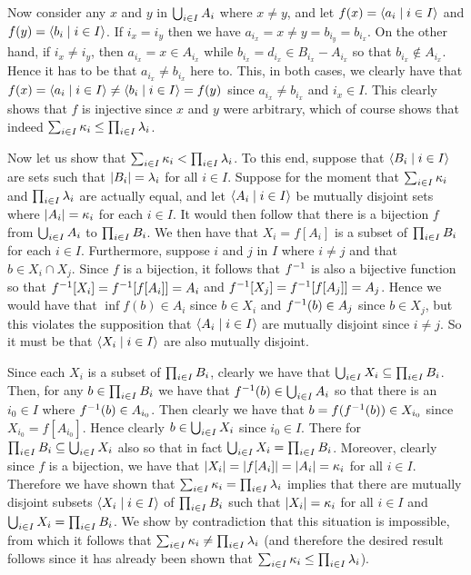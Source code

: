 \begin{questions}
{{    Now consider any $x$ and $y$ in $\bigcup_{i \in I} A_i$ where $x \neq y$, and let $f(x) = \left\langle a_i \mid i \in I \right\rangle$ and $f(y) = \left\langle b_i \mid i \in I \right\rangle$.
    If $i_x = i_y$ then we have $a_{i_x} = x \neq y = b_{i_y} = b_{i_x}$.
    On the other hand, if $i_x \neq i_y$, then $a_{i_x} = x \in A_{i_x}$ while $b_{i_x} = d_{i_x} \in B_{i_x} - A_{i_x}$ so that $b_{i_x} \notin A_{i_x}$.
    Hence it has to be that $a_{i_x} \neq b_{i_x}$ here to.
    This, in both cases, we clearly have that $f(x) = \left\langle a_i \mid i \in I \right\rangle \neq \left\langle b_i \mid i \in I \right\rangle = f(y)$ since $a_{i_x} \neq b_{i_x}$ and $i_x \in I$.
    This clearly shows that $f$ is injective since $x$ and $y$ were arbitrary, which of course shows that indeed $\sum_{i \in I} \kappa_i \leq \prod_{i \in I} \lambda_i$.

    Now let us show that $\sum_{i \in I} \kappa_i < \prod_{i \in I} \lambda_i$.
    To this end, suppose that $\left\langle B_i \mid i \in I \right\rangle$ are sets such that $\left| B_i \right| = \lambda_i$ for all $i \in I$.
    Suppose for the moment that $\sum_{i \in I} \kappa_i$ and $\prod_{i \in I} \lambda_i$ are actually equal, and let $\left\langle A_i \mid i \in I \right\rangle$ be mutually disjoint sets where $\left| A_i \right| = \kappa_i$ for each $i \in I$.
    It would then follow that there is a bijection $f$ from $\bigcup_{i \in I} A_i$ to $\prod_{i \in I} B_i$.
    We then have that $X_i = f[A_i]$ is a subset of $\prod_{i \in I} B_i$ for each $i \in I$.
    Furthermore, suppose $i$ and $j$ in $I$ where $i \neq j$ and that $b \in X_i \cap X_j$.
    Since $f$ is a bijection, it follows that $f^{-1}$ is also a bijective function so that $f^{-1}[X_i] = f^{-1}[f[A_i]] = A_i$ and $f^{-1}[X_j] = f^{-1}[f[A_j]] = A_j$.
    Hence we would have that $\inf{f}(b) \in A_i$ since $b \in X_i$ and $f^{-1}(b) \in A_j$ since $b \in X_j$, but this violates the supposition that $\left\langle A_i \mid i \in I \right\rangle$ are mutually disjoint since $i \neq j$.
    So it must be that $\left\langle X_i \mid i \in I \right\rangle$ are also mutually disjoint.

    Since each $X_i$ is a subset of $\prod_{i \in I} B_i$, clearly we have that $\bigcup_{i \in I} X_i \subseteq \prod_{i \in I} B_i$.
    Then, for any $b \in \prod_{i \in I} B_i$ we have that $f^{-1}(b) \in \bigcup_{i \in I} A_i$ so that there is an $i_0 \in I$ where $f^{-1}(b) \in A_{i_0}$.
    Then clearly we have that $b = f(f^{-1}(b)) \in X_{i_0}$ since $X_{i_0} = f[A_{i_0}]$.
    Hence clearly $b \in \bigcup_{i \in I} X_i$ since $i_0 \in I$.
    There for $\prod_{i \in I} B_i \subseteq \bigcup_{i \in I} X_i$ also so that in fact $\bigcup_{i \in I} X_i = \prod_{i \in I} B_i$.
    Moreover, clearly since $f$ is a bijection, we have that $\left| X_i \right| = \left| f[A_i] \right| = \left| A_i \right| = \kappa_i$ for all $i \in I$.
    Therefore we have shown that $\sum_{i \in I} \kappa_i = \prod_{i \in I} \lambda_i$ implies that there are mutually disjoint subsets $\left\langle X_i \mid i \in I \right\rangle$ of $\prod_{i \in I} B_i$ such that $\left| X_i \right| = \kappa_i$ for all $i \in I$ and $\bigcup_{i \in I} X_i = \prod_{i \in I} B_i$.
    We show by contradiction that this situation is impossible, from which it follows that $\sum_{i \in I} \kappa_i \neq \prod_{i \in I} \lambda_i$ (and therefore the desired result follows since it has already been shown that $\sum_{i \in I} \kappa_i \leq \prod_{i \in I} \lambda_i$).

}}
\end{questions}
